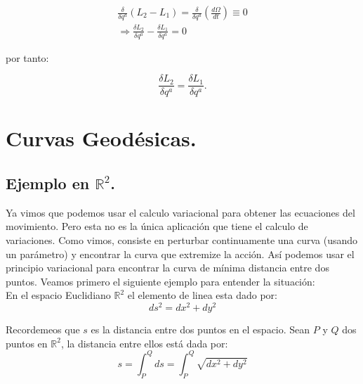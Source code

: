 \documentclass[12pt]{report}
\begin{document}
\begin{eqnarray}
\frac{\delta}{\delta q^a} \left( L_2 - L_1 \right) = \frac{\delta}{\delta q^a} \left( \frac{d\Omega}{dt} \right) \equiv 0 \\
\Rightarrow \frac{\delta L_2}{\delta q^a} - \frac{\delta L_1}{\delta q^a} = 0
\end{eqnarray}

por tanto:

\begin{equation}
\frac{\delta L_2}{\delta q^a}=\frac{\delta L_1}{\delta q^a}.
\end{equation}


















\section{Curvas Geod\'esicas.}

\subsection{Ejemplo en $\mathbb{R}^{2}$.}


Ya vimos que podemos usar el calculo variacional para obtener las ecuaciones del movimiento. Pero esta no es la \'unica aplicaci\'on que 
tiene el calculo de variaciones. Como vimos, consiste en perturbar continuamente una curva (usando un parámetro) y encontrar la curva que 
extremize la acción. Así podemos usar el principio variacional para encontrar la curva de mínima distancia entre dos puntos. Veamos 
primero el siguiente ejemplo para entender la situación: \\

En el espacio Euclidiano $\mathbb{R}^{2}$ el elemento de linea esta dado por:
	\begin{equation*}
		ds^{2} = dx^{2} + dy^{2}
	\end{equation*}

Recordemeos que $s$ es la distancia entre dos puntos en el espacio. Sean $P$ y $Q$ dos puntos en $\mathbb{R}^{2}$, la distancia entre ellos está dada por:
	\begin{equation*}
		s = \int^{Q}_{P} ds = \int^{Q}_{P} \sqrt{dx^{2} + dy^{2}}
	\end{equation*}
\end{document}
